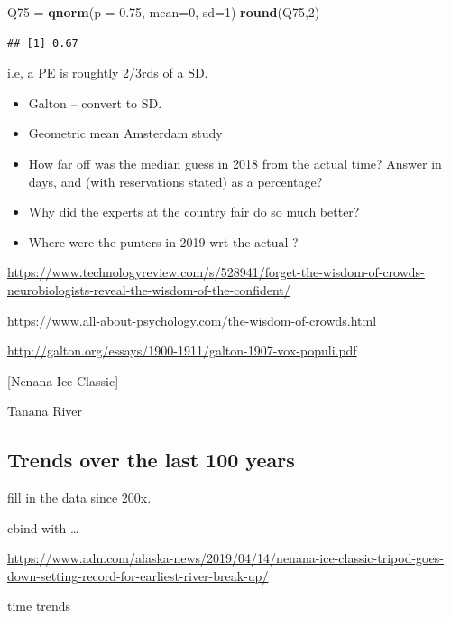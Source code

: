 \documentclass[]{book}
\newenvironment{Shaded}{\begin{snugshade}}{\end{snugshade}}
\newcommand{\DataTypeTok}[1]{\textcolor[rgb]{0.13,0.29,0.53}{#1}}
\newcommand{\DecValTok}[1]{\textcolor[rgb]{0.00,0.00,0.81}{#1}}
\newcommand{\FloatTok}[1]{\textcolor[rgb]{0.00,0.00,0.81}{#1}}
\newcommand{\KeywordTok}[1]{\textcolor[rgb]{0.13,0.29,0.53}{\textbf{#1}}}
\newcommand{\NormalTok}[1]{#1}
\newcommand{\StringTok}[1]{\textcolor[rgb]{0.31,0.60,0.02}{#1}}
\begin{document}
\begin{Shaded}
\begin{Highlighting}[]
\NormalTok{Q75 =}\StringTok{ }\KeywordTok{qnorm}\NormalTok{(}\DataTypeTok{p =} \FloatTok{0.75}\NormalTok{, }\DataTypeTok{mean=}\DecValTok{0}\NormalTok{, }\DataTypeTok{sd=}\DecValTok{1}\NormalTok{)}
\KeywordTok{round}\NormalTok{(Q75,}\DecValTok{2}\NormalTok{)}
\end{Highlighting}
\end{Shaded}

\begin{verbatim}
## [1] 0.67
\end{verbatim}

i.e, a PE is roughtly 2/3rds of a SD.

\begin{itemize}
\item
  Galton -- convert to SD.
\item
  Geometric mean Amsterdam study
\item
  How far off was the median guess in 2018 from the actual time? Answer in days, and (with reservations stated) as a percentage?
\item
  Why did the experts at the country fair do so much better?
\item
  Where were the punters in 2019 wrt the actual ?
\end{itemize}

\url{https://www.technologyreview.com/s/528941/forget-the-wisdom-of-crowds-neurobiologists-reveal-the-wisdom-of-the-confident/}

\url{https://www.all-about-psychology.com/the-wisdom-of-crowds.html}

\url{http://galton.org/essays/1900-1911/galton-1907-vox-populi.pdf}

{[}Nenana Ice Classic{]}

Tanana River

\hypertarget{trends-over-the-last-100-years}{%
\subsection{Trends over the last 100 years}\label{trends-over-the-last-100-years}}

fill in the data since 200x.

cbind with \ldots{}

\url{https://www.adn.com/alaska-news/2019/04/14/nenana-ice-classic-tripod-goes-down-setting-record-for-earliest-river-break-up/}

time trends
\end{document}
